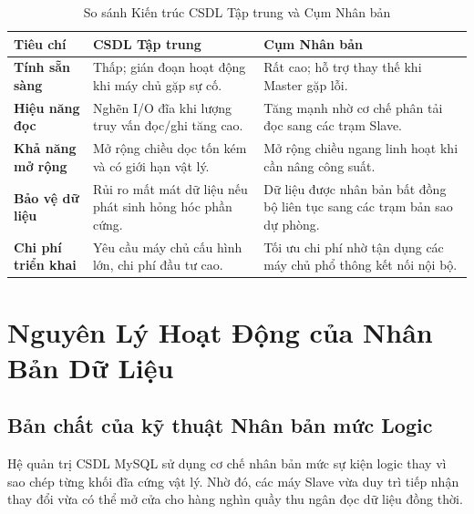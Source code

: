 \documentclass[12pt,a4paper]{report}
\begin{document}
\begin{table}[htbp]
\centering
\caption{So sánh Kiến trúc CSDL Tập trung và Cụm Nhân bản}
\label{tab:ss_kientruc}
\begin{tabularx}{\linewidth}{|>{\raggedright\arraybackslash\bfseries}p{4.2cm}|>{\raggedright\arraybackslash}X|>{\raggedright\arraybackslash}X|}
\hline
\textmd{\textbf{Tiêu chí}} & \textmd{\textbf{CSDL Tập trung}} & \textmd{\textbf{Cụm Nhân bản}} \\ \hline
Tính sẵn sàng & Thấp; gián đoạn hoạt động khi máy chủ gặp sự cố. & Rất cao; hỗ trợ thay thế khi Master gặp lỗi. \\ \hline
Hiệu năng đọc & Nghẽn I/O đĩa khi lượng truy vấn đọc/ghi tăng cao. & Tăng mạnh nhờ cơ chế phân tải đọc sang các trạm Slave. \\ \hline
Khả năng mở rộng & Mở rộng chiều dọc tốn kém và có giới hạn vật lý. & Mở rộng chiều ngang linh hoạt khi cần nâng công suất. \\ \hline
Bảo vệ dữ liệu & Rủi ro mất mát dữ liệu nếu phát sinh hỏng hóc phần cứng. & Dữ liệu được nhân bản bất đồng bộ liên tục sang các trạm bản sao dự phòng. \\ \hline
Chi phí triển khai & Yêu cầu máy chủ cấu hình lớn, chi phí đầu tư cao. & Tối ưu chi phí nhờ tận dụng các máy chủ phổ thông kết nối nội bộ. \\ \hline
\end{tabularx}
\end{table}

\section{Nguyên Lý Hoạt Động của Nhân Bản Dữ Liệu}

\subsection{Bản chất của kỹ thuật Nhân bản mức Logic}
Hệ quản trị CSDL MySQL sử dụng cơ chế nhân bản mức sự kiện logic thay vì sao chép từng khối đĩa cứng vật lý. Nhờ đó, các máy Slave vừa duy trì tiếp nhận thay đổi vừa có thể mở cửa cho hàng nghìn quầy thu ngân đọc dữ liệu đồng thời.
\end{document}
